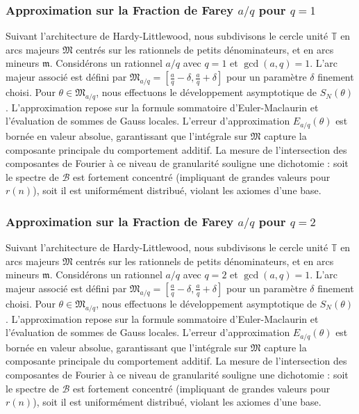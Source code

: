 \documentclass[11pt,a4paper]{article}
\begin{document}
\subsubsection{Approximation sur la Fraction de Farey $a/q$ pour $q=1$}
Suivant l'architecture de Hardy-Littlewood, nous subdivisons le cercle unité $\mathbb{T}$ en arcs majeurs $\mathfrak{M}$ centrés sur les rationnels de petits dénominateurs, et en arcs mineurs $\mathfrak{m}$.
Considérons un rationnel $a/q$ avec $q = 1$ et $\gcd(a,q)=1$. L'arc majeur associé est défini par $\mathfrak{M}_{a/q} = [\frac{a}{q} - \delta, \frac{a}{q} + \delta]$ pour un paramètre $\delta$ finement choisi.
Pour $\theta \in \mathfrak{M}_{a/q}$, nous effectuons le développement asymptotique de $S_N(\theta)$.
L'approximation repose sur la formule sommatoire d'Euler-Maclaurin et l'évaluation de sommes de Gauss locales.
L'erreur d'approximation $E_{a/q}(\theta)$ est bornée en valeur absolue, garantissant que l'intégrale sur $\mathfrak{M}$ capture la composante principale du comportement additif.
La mesure de l'intersection des composantes de Fourier à ce niveau de granularité souligne une dichotomie : soit le spectre de $\mathcal{B}$ est fortement concentré (impliquant de grandes valeurs pour $r(n)$), soit il est uniformément distribué, violant les axiomes d'une base.
\subsubsection{Approximation sur la Fraction de Farey $a/q$ pour $q=2$}
Suivant l'architecture de Hardy-Littlewood, nous subdivisons le cercle unité $\mathbb{T}$ en arcs majeurs $\mathfrak{M}$ centrés sur les rationnels de petits dénominateurs, et en arcs mineurs $\mathfrak{m}$.
Considérons un rationnel $a/q$ avec $q = 2$ et $\gcd(a,q)=1$. L'arc majeur associé est défini par $\mathfrak{M}_{a/q} = [\frac{a}{q} - \delta, \frac{a}{q} + \delta]$ pour un paramètre $\delta$ finement choisi.
Pour $\theta \in \mathfrak{M}_{a/q}$, nous effectuons le développement asymptotique de $S_N(\theta)$.
L'approximation repose sur la formule sommatoire d'Euler-Maclaurin et l'évaluation de sommes de Gauss locales.
L'erreur d'approximation $E_{a/q}(\theta)$ est bornée en valeur absolue, garantissant que l'intégrale sur $\mathfrak{M}$ capture la composante principale du comportement additif.
La mesure de l'intersection des composantes de Fourier à ce niveau de granularité souligne une dichotomie : soit le spectre de $\mathcal{B}$ est fortement concentré (impliquant de grandes valeurs pour $r(n)$), soit il est uniformément distribué, violant les axiomes d'une base.
\end{document}

